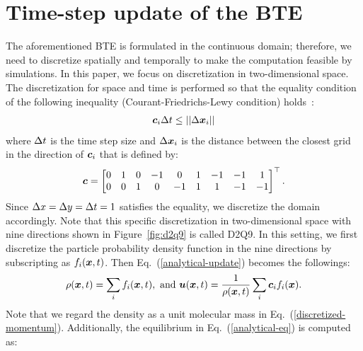 \section{Time-step update of the BTE}
The aforementioned BTE is formulated in the 
continuous domain; therefore,
we need to discretize spatially and 
temporally to make the computation 
feasible by simulations.
In this paper, we focus on discretization
in two-dimensional space.
The discretization for space and time
is performed so that the equality condition of 
the following inequality
(Courant-Friedrichs-Lewy condition) holds~\cite{peyretcomputational, sterling1996stability}:
\begin{equation*}
\begin{aligned}
  \boldsymbol{c}_i \Delta t \leq || \Delta \boldsymbol{x}_i ||
\end{aligned}
\end{equation*}
where $\Delta t$ is the time step size 
and $\Delta \boldsymbol{x}_i$ is the distance between 
the closest grid in the direction
of $\boldsymbol{c}_i$ that is defined by:
\begin{equation}
\begin{aligned}
  \boldsymbol{c} = \begin{bmatrix}
    0 & 1 & 0 & -1 & 0 & 1 & -1 & -1 & 1 \\
    0 & 0 & 1 & 0 & -1 & 1 & 1 & -1 & -1 \\
  \end{bmatrix}^\top.
\end{aligned}
\label{d2q9-velocity}
\end{equation}
Since $\Delta x = \Delta y = \Delta t = 1$ satisfies the equality, 
we discretize the domain accordingly.
Note that this specific discretization in two-dimensional
space with nine directions shown in 
Figure~\ref{fig:d2q9} is called D2Q9.
In this setting, 
we first discretize
the particle probability density function
in the nine directions by subscripting 
as $f_i(\boldsymbol{x}, t)$.
Then Eq.~(\ref{analytical-update}) becomes the followings:
\begin{equation}
  \begin{aligned}
    \rho(\boldsymbol{x}, t) = \sum_i f_i(\boldsymbol{x}, t), \text{ and }
    \boldsymbol{u}(\boldsymbol{x}, t) = 
    \frac{1}{\rho(\boldsymbol{x}, t)} \sum_i \boldsymbol{c}_i f_i(\boldsymbol{x}). \\
  \end{aligned}
  \label{discretized-momentum}
\end{equation}
Note that we regard the density as
a unit molecular mass in Eq.~(\ref{discretized-momentum}).
Additionally, the equilibrium in Eq.~(\ref{analytical-eq}) is computed as:
